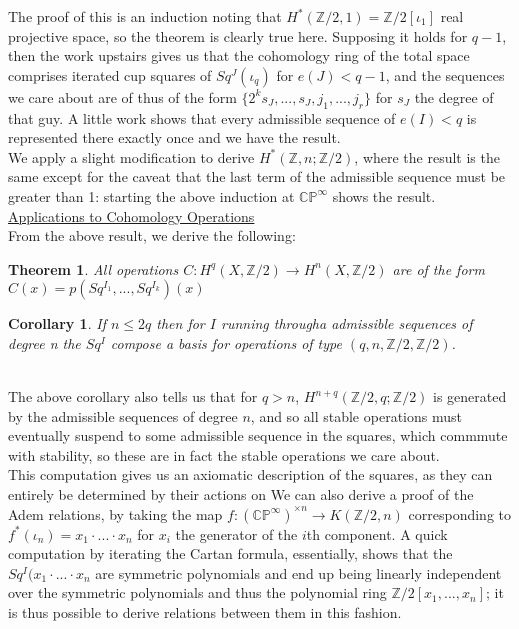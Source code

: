 \documentclass{article}
\newcommand{\bb}[1]{\mathbb{#1}}
\newtheorem{theorem}{Theorem}
\newtheorem{Corollary}{Corollary}
\newcommand{\bb}[1]{\mathbb{#1}}
\begin{document}
The proof of this is an induction noting that $H^{*}(\bb{Z}/2, 1) = \bb{Z}/2[\iota_{1}]$ real projective space, so the theorem is clearly true here. Supposing it holds for $q-1$, then the work upstairs gives us that the cohomology ring of the total space comprises iterated cup squares of $Sq^{J}(\iota_{q})$ for $e(J) < q-1$, and the sequences we care about are of thus of the form $\{2^{k}s_{J},...,s_{J},j_{1},...,j_{r}\}$ for $s_{J}$ the degree of that guy. A little work shows that every admissible sequence of $e(I) < q$ is represented there exactly once and we have the result. \\

We apply a slight modification to derive $H^{*}(\bb{Z},n; \bb{Z}/2)$, where the result is the same except for the caveat that the last term of the admissible sequence must be greater than 1: starting the above induction at $\bb{CP}^{\infty}$ shows the result. \\

\underline{Applications to Cohomology Operations} \\

From the above result, we derive the following:
\begin{theorem}
  All operations $C: H^{q}(X, \bb{Z}/2) \to H^{n}(X,\bb{Z}/2)$ are of the form $C(x) = p(Sq^{I_{1}},...,Sq^{I_{k}})(x)$
\end{theorem}
\begin{Corollary}
  If $n \leq 2q$ then for $I$ running througha admissible sequences of degree n the $Sq^{I}$ compose a basis for operations of type $(q, n, \bb{Z}/2, \bb{Z}/2)$.
\end{Corollary} \\

The above corollary also tells us that for $q > n$, $H^{n+q}(\mathbb{Z}/2,q;\bb{Z}/2)$ is generated by the admissible sequences of degree $n$, and so all stable operations must eventually suspend to some admissible sequence in the squares, which commmute with stability, so these are in fact the stable operations we care about. \\

This computation gives us an axiomatic description of the squares, as they can entirely be determined by their actions on  
We can also derive a proof of the Adem relations, by taking the map $f: (\bb{CP}^{\infty})^{\times n} \to K(\mathbb{Z}/2, n)$ corresponding to $f^{*}(\iota_{n}) = x_{1}\cdot...\cdot x_{n}$ for $x_{i}$ the generator of the $i$th component. A quick computation by iterating the Cartan formula, essentially, shows that the $Sq^{I}(x_{1}\cdot ... \cdot x_{n}$ are symmetric polynomials and end up being linearly independent over the symmetric polynomials and thus the polynomial ring $\bb{Z}/2[x_{1},...,x_{n}]$; it is thus possible to derive relations between them in this fashion.
\end{document}

